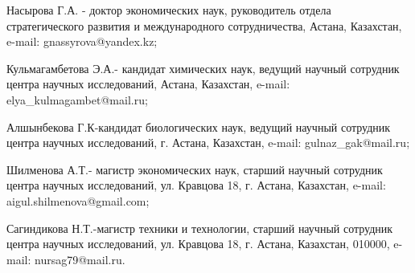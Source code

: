 \begin{info}
Насырова Г.А. - доктор экономических наук, руководитель отдела
стратегического развития и международного сотрудничества, Астана,
Казахстан, e-mail: gnassyrova@yandex.kz;

Кульмагамбетова Э.А.- кандидат химических наук, ведущий научный
сотрудник центра научных исследований, Астана, Казахстан, e-mail:
elya\_kulmagambet@mail.ru;

Алшынбекова Г.К-кандидат биологических наук, ведущий научный сотрудник
центра научных исследований, г. Астана, Казахстан, e-mail:
gulnaz\_gak@mail.ru;

Шилменова А.Т.- магистр экономических наук, старший научный сотрудник
центра научных исследований, ул. Кравцова 18, г. Астана, Казахстан,
e-mail:
aigul.shilmenova@gmail.com;

Сагиндикова Н.Т.-магистр техники и технологии, старший научный сотрудник
центра научных исследований, ул. Кравцова 18, г. Астана, Казахстан,
010000, e-mail: nursag79@mail.ru.
\end{info}
